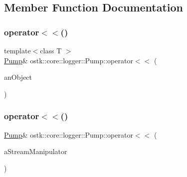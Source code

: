 \subsection{Member Function Documentation}
\mbox{\label{classostk_1_1core_1_1logger_1_1_pump_ac2bb85f5e310c5cccf792d85b317acda}} 
\subsubsection{\texorpdfstring{operator$<$$<$()}{operator<<()}\hspace{0.1cm}{\footnotesize\ttfamily [1/2]}}
{\footnotesize\ttfamily template$<$class T $>$ \\
\hyperlink{classostk_1_1core_1_1logger_1_1_pump}{Pump}\& ostk\+::core\+::logger\+::\+Pump\+::operator$<$$<$ (\begin{DoxyParamCaption}\item[{const T \&}]{an\+Object }\end{DoxyParamCaption})\hspace{0.3cm}{\ttfamily [inline]}}

\mbox{\label{classostk_1_1core_1_1logger_1_1_pump_a6ab7044123e2f99752a043a462632a6b}} 
\subsubsection{\texorpdfstring{operator$<$$<$()}{operator<<()}\hspace{0.1cm}{\footnotesize\ttfamily [2/2]}}
{\footnotesize\ttfamily \hyperlink{classostk_1_1core_1_1logger_1_1_pump}{Pump}\& ostk\+::core\+::logger\+::\+Pump\+::operator$<$$<$ (\begin{DoxyParamCaption}\item[{\hyperlink{classostk_1_1core_1_1logger_1_1_pump_a76c2ff8c48c3484e3ca179667a7a7b31}{Stream\+Manipulator}}]{a\+Stream\+Manipulator }\end{DoxyParamCaption})\hspace{0.3cm}{\ttfamily [inline]}}

